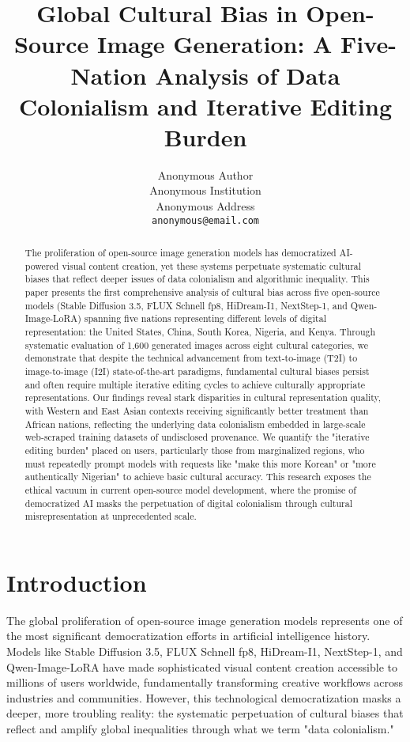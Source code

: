 \documentclass{article}
\title{Global Cultural Bias in Open-Source Image Generation: A Five-Nation Analysis of Data Colonialism and Iterative Editing Burden}
\author{%
  Anonymous Author\\
  Anonymous Institution\\
  Anonymous Address \\
  \texttt{anonymous@email.com} \\
}
\begin{document}
\maketitle

\begin{abstract}
  The proliferation of open-source image generation models has democratized AI-powered visual content creation, yet these systems perpetuate systematic cultural biases that reflect deeper issues of data colonialism and algorithmic inequality. This paper presents the first comprehensive analysis of cultural bias across five open-source models (Stable Diffusion 3.5, FLUX Schnell fp8, HiDream-I1, NextStep-1, and Qwen-Image-LoRA) spanning five nations representing different levels of digital representation: the United States, China, South Korea, Nigeria, and Kenya. Through systematic evaluation of 1,600 generated images across eight cultural categories, we demonstrate that despite the technical advancement from text-to-image (T2I) to image-to-image (I2I) state-of-the-art paradigms, fundamental cultural biases persist and often require multiple iterative editing cycles to achieve culturally appropriate representations. Our findings reveal stark disparities in cultural representation quality, with Western and East Asian contexts receiving significantly better treatment than African nations, reflecting the underlying data colonialism embedded in large-scale web-scraped training datasets of undisclosed provenance. We quantify the "iterative editing burden" placed on users, particularly those from marginalized regions, who must repeatedly prompt models with requests like "make this more Korean" or "more authentically Nigerian" to achieve basic cultural accuracy. This research exposes the ethical vacuum in current open-source model development, where the promise of democratized AI masks the perpetuation of digital colonialism through cultural misrepresentation at unprecedented scale.
\end{abstract}


\section{Introduction}

The global proliferation of open-source image generation models represents one of the most significant democratization efforts in artificial intelligence history. Models like Stable Diffusion 3.5, FLUX Schnell fp8, HiDream-I1, NextStep-1, and Qwen-Image-LoRA have made sophisticated visual content creation accessible to millions of users worldwide, fundamentally transforming creative workflows across industries and communities. However, this technological democratization masks a deeper, more troubling reality: the systematic perpetuation of cultural biases that reflect and amplify global inequalities through what we term "data colonialism."
\end{document}
